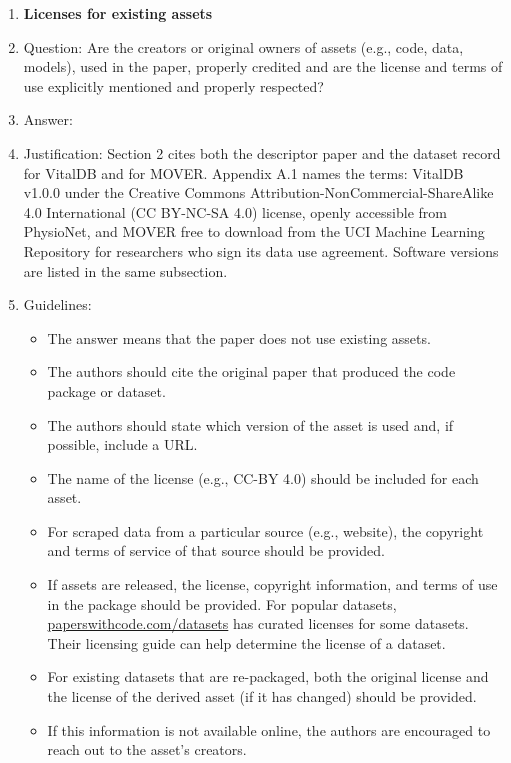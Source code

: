 \begin{enumerate}
\item {\bf Licenses for existing assets}
    \item[] Question: Are the creators or original owners of assets (e.g., code, data, models), used in the paper, properly credited and are the license and terms of use explicitly mentioned and properly respected?
    \item[] Answer: \answerYes{}
    \item[] Justification: Section 2 cites both the descriptor paper and the dataset record for VitalDB and for MOVER. Appendix A.1 names the terms: VitalDB v1.0.0 under the Creative Commons Attribution-NonCommercial-ShareAlike 4.0 International (CC BY-NC-SA 4.0) license, openly accessible from PhysioNet, and MOVER free to download from the UCI Machine Learning Repository for researchers who sign its data use agreement. Software versions are listed in the same subsection.
    \item[] Guidelines:
    \begin{itemize}
        \item The answer \answerNA{} means that the paper does not use existing assets.
        \item The authors should cite the original paper that produced the code package or dataset.
        \item The authors should state which version of the asset is used and, if possible, include a URL.
        \item The name of the license (e.g., CC-BY 4.0) should be included for each asset.
        \item For scraped data from a particular source (e.g., website), the copyright and terms of service of that source should be provided.
        \item If assets are released, the license, copyright information, and terms of use in the package should be provided. For popular datasets, \url{paperswithcode.com/datasets} has curated licenses for some datasets. Their licensing guide can help determine the license of a dataset.
        \item For existing datasets that are re-packaged, both the original license and the license of the derived asset (if it has changed) should be provided.
        \item If this information is not available online, the authors are encouraged to reach out to the asset's creators.
    \end{itemize}


\end{enumerate}
